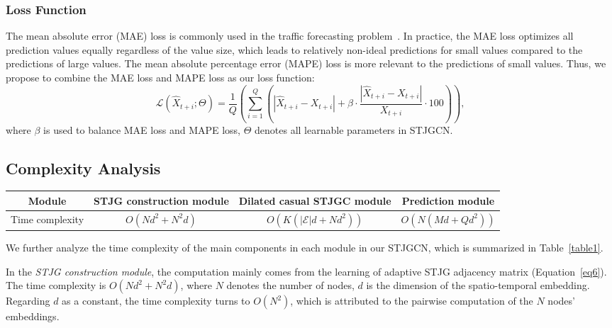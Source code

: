 \documentclass[10pt,journal,compsoc]{IEEEtran}
\begin{document}
\subsubsection{Loss Function} 

The mean absolute error (MAE) loss is commonly used in the traffic forecasting problem~\cite{Li-et-al:ICLR2018,Wu-et-al:IJCAI2019,Zheng-et-al:AAAI2020}. In practice, the MAE loss optimizes all prediction values equally regardless of the value size, which leads to relatively non-ideal predictions for small values compared to the predictions of large values. The mean absolute percentage error (MAPE) loss is more relevant to the predictions of small values. Thus, we propose to combine the MAE loss and MAPE loss as our loss function:  
%
\begin{equation}
\mathcal{L}(\hat{X}_{t+i};\Theta) = \frac{1}{Q}(\sum_{i=1}^{Q}(|\hat{X}_{t+i}-X_{t+i}| + \beta \cdot \frac{|\hat{X}_{t+i}-X_{t+i}|}{X_{t+i}} \cdot 100))
\label{eq19},
\end{equation}
%
where $ \beta $ is used to balance MAE loss and MAPE loss, $ \Theta $ denotes all learnable parameters in STJGCN. 

\subsection{Complexity Analysis}

\begin{table*}
	\centering
	\caption{Time complexity analysis.}
		\begin{tabular}{cccc}
			\toprule
			Module			& STJG construction module	& Dilated casual STJGC module	& Prediction module	\\
			\midrule
			Time complexity	& $ O(Nd^2+N^2d) $			& $ O(K(|\mathcal{E}|d+Nd^2)) $ & $ O(N(Md+Qd^2)) $	\\
			\bottomrule
	\end{tabular}
	\label{table1}
\end{table*}

We further analyze the time complexity of the main components in each module in our STJGCN, which is summarized in Table~\ref{table1}. 

In the \textit{STJG construction module}, the computation mainly comes from the learning of adaptive STJG adjacency matrix (Equation~\ref{eq6}). The time complexity is $ O(Nd^2+N^2d) $, where $ N $ denotes the number of nodes, $ d $ is the dimension of the spatio-temporal embedding. Regarding $ d $ as a constant, the time complexity turns to $ O(N^2) $, which is attributed to the pairwise computation of the $ N $ nodes' embeddings. 
\end{document}
